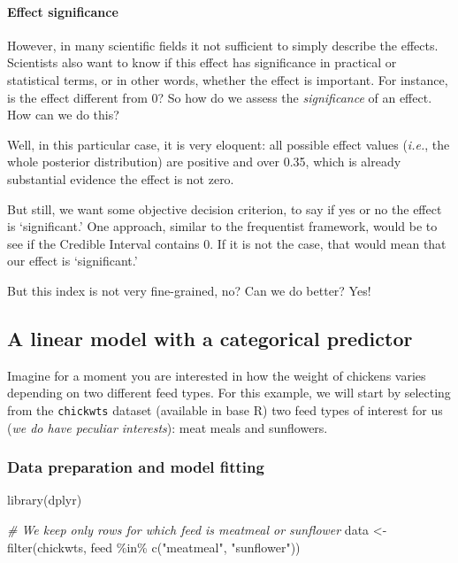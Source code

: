 \documentclass[10pt,a4paper,onecolumn]{article}
\newenvironment{Shaded}{\begin{snugshade}}{\end{snugshade}}
\newcommand{\CommentTok}[1]{\textcolor[rgb]{0.56,0.35,0.01}{\textit{#1}}}
\newcommand{\FunctionTok}[1]{\textcolor[rgb]{0.00,0.00,0.00}{#1}}
\newcommand{\NormalTok}[1]{#1}
\newcommand{\OtherTok}[1]{\textcolor[rgb]{0.56,0.35,0.01}{#1}}
\newcommand{\SpecialCharTok}[1]{\textcolor[rgb]{0.00,0.00,0.00}{#1}}
\newcommand{\StringTok}[1]{\textcolor[rgb]{0.31,0.60,0.02}{#1}}
\let\oldparagraph\paragraph
\renewcommand{\paragraph}[1]{\oldparagraph{#1}\mbox{}}
\begin{document}
\hypertarget{effect-significance}{%
\paragraph{Effect significance}\label{effect-significance}}

However, in many scientific fields it not sufficient to simply describe
the effects. Scientists also want to know if this effect has
significance in practical or statistical terms, or in other words,
whether the effect is important. For instance, is the effect different
from 0? So how do we assess the \emph{significance} of an effect. How
can we do this?

Well, in this particular case, it is very eloquent: all possible effect
values (\emph{i.e.}, the whole posterior distribution) are positive and
over 0.35, which is already substantial evidence the effect is not zero.

But still, we want some objective decision criterion, to say if yes or
no the effect is `significant.' One approach, similar to the frequentist
framework, would be to see if the Credible Interval contains 0. If it is
not the case, that would mean that our effect is `significant.'

But this index is not very fine-grained, no? Can we do better? Yes!

\hypertarget{a-linear-model-with-a-categorical-predictor}{%
\subsection{A linear model with a categorical
predictor}\label{a-linear-model-with-a-categorical-predictor}}

Imagine for a moment you are interested in how the weight of chickens
varies depending on two different feed types. For this example, we will
start by selecting from the \texttt{chickwts} dataset (available in base
R) two feed types of interest for us (\emph{we do have peculiar
interests}): meat meals and sunflowers.

\hypertarget{data-preparation-and-model-fitting}{%
\subsubsection{Data preparation and model
fitting}\label{data-preparation-and-model-fitting}}

\begin{Shaded}
\begin{Highlighting}[]
\FunctionTok{library}\NormalTok{(dplyr)}

\CommentTok{\# We keep only rows for which feed is meatmeal or sunflower}
\NormalTok{data }\OtherTok{\textless{}{-}} \FunctionTok{filter}\NormalTok{(chickwts, feed }\SpecialCharTok{\%in\%} \FunctionTok{c}\NormalTok{(}\StringTok{"meatmeal"}\NormalTok{, }\StringTok{"sunflower"}\NormalTok{))}
\end{Highlighting}
\end{Shaded}
\end{document}
